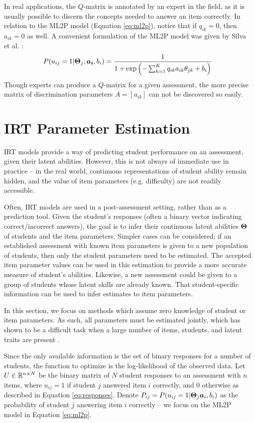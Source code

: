 In real applications, the $Q$-matrix is annotated by an expert in the field, as it is usually possible to discern the concepts needed to answer an item correctly. In relation to the ML2P model (Equation \ref{eq:ml2p}), notice that if $q_{ik} = 0$, then $a_{ik} = 0$ as well. A convenient formulation of the ML2P model was given by Silva et al. \cite{daSilva2018}:
\begin{equation}
  P(u_{ij} = 1 | \boldsymbol{\Theta}_j; \boldsymbol{a_i}, b_i) = \frac{1}{1 + \exp\left(-\sum_{k=1}^K q_{ik} a_{ik} \theta_{jk} + b_i \right)}
  \label{eq:ml2pq}
\end{equation}
Though experts can produce a $Q$-matrix for a given assessment, the more precise matrix of discrimination parameters $A = [a_{ik}]$ can not be discovered so easily.

\section{IRT Parameter Estimation} \label{sec:irt_est_background}
IRT models provide a way of predicting student performance on an assessment, given their latent abilities. However, this is not always of immediate use in practice -- in the real world, continuous representations of student ability remain hidden, and the value of item parameters (e.g. difficulty) are not readily accessible.

Often, IRT models are used in a post-assessment setting, rather than as a prediction tool. Given the student's responses (often a binary vector indicating correct/incorrect answers), the goal is to infer their continuous latent abilities $\boldsymbol{\Theta}$ of students and the item parameters. Simpler cases can be considered; if an established assessment with known item parameters is given to a new population of students, then only the student parameters need to be estimated. The accepted item parameter values can be used in this estimation to provide a more accurate measure of student's abilities. Likewise, a new assessment could be given to a group of students whose latent skills are already known. That student-specific information can be used to infer estimates to item parameters.

In this section, we focus on methods which assume zero knowledge of student or item parameters. As such, all parameters must be estimated jointly, which has shown to be a difficult task when a large number of items, students, and latent traits are present \cite{cai2009}. 

Since the only available information is the set of binary responses for a number of students, the function to optimize is the log-likelihood of the observed data. Let $U \in \mathbb{R}^{n \times N}$ be the binary matrix of $N$ student responses to an assessment with $n$ items, where $u_{ij} = 1$ if student $j$ answered item $i$ correctly, and $0$ otherwise as described in Equation \ref{eq:responses}. Denote $P_{ij} = P(u_{ij} = 1 | \boldsymbol{\Theta}_j \boldsymbol{a}_i, b_i)$ as the probability of student $j$ answering item $i$ correctly -- we focus on the ML2P model in Equation \ref{eq:ml2p}.

